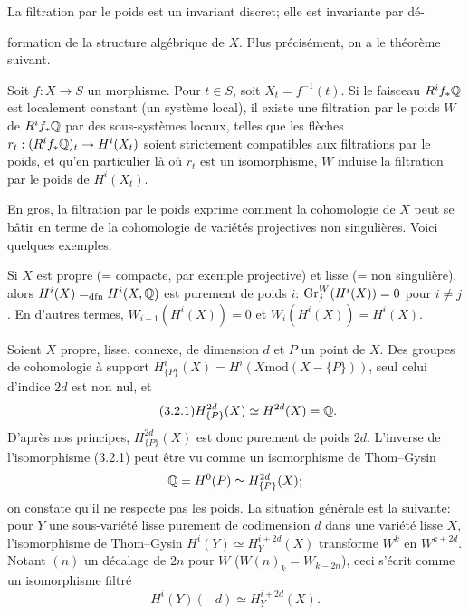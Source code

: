 \documentclass[8pt]{extarticle}
\begin{document}
La filtration par le poids est un invariant discret; elle est invariante par dé-

\vfill
{}
\EndSourcePage

\ReaderFont
formation de la structure algébrique de \(X\). Plus précisément, on a le théorème suivant.

 Soit \(f:X\to S\) un morphisme. Pour \(t\in S\), soit \(X_t=f^{-1}(t)\). Si le faisceau \(R^if_*\mathbb{Q}\) est localement constant (un système local), il existe une filtration par le poids \(W\) de \(R^if_*\mathbb{Q}\) par des sous-systèmes locaux, telles que les flèches \(r_t:(R^if_*\mathbb{Q})_t\to H^i(X_t)\) soient strictement compatibles aux filtrations par le poids, et qu'en particulier là où \(r_t\) est un isomorphisme, \(W\) induise la filtration par le poids de \(H^i(X_t)\).\EndTheorem

 En gros, la filtration par le poids exprime comment la cohomologie de \(X\) peut se bâtir en terme de la cohomologie de variétés projectives non singulières. Voici quelques exemples.

 Si \(X\) est propre (= compacte, par exemple projective) et lisse (= non singulière), alors \(H^i(X)=_{\mathrm{dfn}}H^i(X,\mathbb{Q})\) est purement de poids \(i\): \(\operatorname{Gr}_j^W(H^i(X))=0\) pour \(i\ne j\). En d'autres termes, \(W_{i-1}(H^i(X))=0\) et \(W_i(H^i(X))=H^i(X)\).

 Soient \(X\) propre, lisse, connexe, de dimension \(d\) et \(P\) un point de \(X\). Des groupes de cohomologie à support \(H^i_{\{P\}}(X)=H^i(X\mathbin{\mathrm{mod}}(X-\{P\}))\), seul celui d'indice \(2d\) est non nul, et
\begin{equation}\tag{3.2.1}
H^{2d}_{\{P\}}(X)\simeq H^{2d}(X)=\mathbb{Q}.
\end{equation}
D'après nos principes, \(H^{2d}_{\{P\}}(X)\) est donc purement de poids \(2d\). L'inverse de l'isomorphisme (3.2.1) peut être vu comme un isomorphisme de Thom--Gysin
\[
\mathbb{Q}=H^0(P)\simeq H^{2d}_{\{P\}}(X);
\]
on constate qu'il ne respecte pas les poids. La situation générale est la suivante: pour \(Y\) une sous-variété lisse purement de codimension \(d\) dans une variété lisse \(X\), l'isomorphisme de Thom--Gysin \(H^i(Y)\simeq H_Y^{i+2d}(X)\) transforme \(W^k\) en \(W^{k+2d}\). Notant \((n)\) un décalage de \(2n\) pour \(W\) (\(W(n)_k=W_{k-2n}\)), ceci s'écrit comme un isomorphisme filtré
\[
H^i(Y)(-d)\simeq H_Y^{i+2d}(X).
\]
\end{document}
